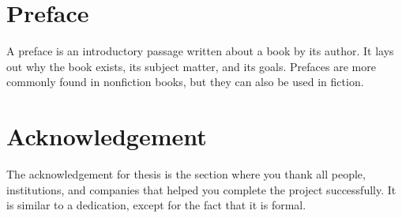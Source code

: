 \documentclass[]{buthesis}
\begin{document}
%
\clearpage
\section*{Preface}
A preface is an introductory passage written about a book by its author. It lays out why the book exists, its subject matter, and its goals. Prefaces are more commonly found in nonfiction books, but they can also be used in fiction.


%
\clearpage
\section*{Acknowledgement}
The acknowledgement for thesis is the section where you thank all people, institutions, and companies that helped you complete the project successfully. It is similar to a dedication, except for the fact that it is formal.


%
\clearpage
\tableofcontents


%
\clearpage
\listoffigures


%
\clearpage
\listoftables


%
\clearpage



%
%
\clearpage
{}
\setcounter{page}{1}
\fancyhead[R]{\thepage}
\fancyhead[L]{\nouppercase{\S\leftmark}}
% 

% 

%
\printbibliography[heading=bibnumbered]
\printbibliography[heading=subbibnumbered,
                   keyword={physics},
                   title={Physics-related only}]



\end{document}
